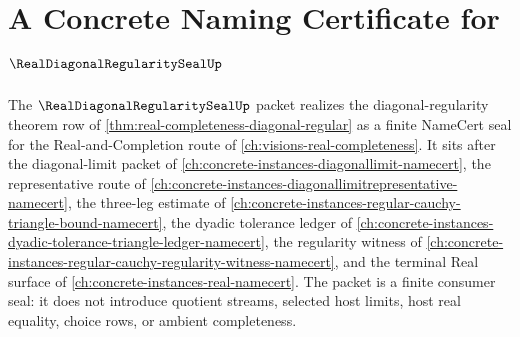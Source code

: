 \chapter{A Concrete Naming Certificate for $\RealDiagonalRegularitySealUp$}
\label{ch:concrete-instances-real-diagonal-regularity-seal-namecert}

The $\RealDiagonalRegularitySealUp$ packet realizes the diagonal-regularity theorem row of \autoref{thm:real-completeness-diagonal-regular} as a finite NameCert seal for the Real-and-Completion route of \autoref{ch:visions-real-completeness}. It sits after the diagonal-limit packet of \autoref{ch:concrete-instances-diagonallimit-namecert}, the representative route of \autoref{ch:concrete-instances-diagonallimitrepresentative-namecert}, the three-leg estimate of \autoref{ch:concrete-instances-regular-cauchy-triangle-bound-namecert}, the dyadic tolerance ledger of \autoref{ch:concrete-instances-dyadic-tolerance-triangle-ledger-namecert}, the regularity witness of \autoref{ch:concrete-instances-regular-cauchy-regularity-witness-namecert}, and the terminal Real surface of \autoref{ch:concrete-instances-real-namecert}. The packet is a finite consumer seal: it does not introduce quotient streams, selected host limits, host real equality, choice rows, or ambient completeness.

